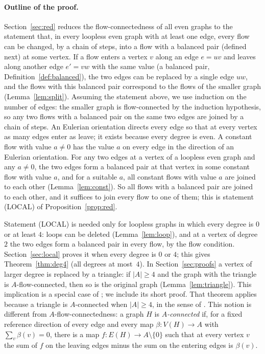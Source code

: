 \documentclass[11pt]{article}
\theoremstyle{definition}
\begin{document}
\paragraph{Outline of the proof.}
Section~\ref{sec:red} reduces the flow-connectedness of all even graphs to the statement that, in every loopless even graph
with at least one edge, every flow can be changed, by a chain of steps, into a flow with a balanced pair (defined next) at some vertex. If a flow enters a vertex $v$ along an edge
$e=uv$ and leaves along another edge $e'=vw$ with the same value (a balanced pair, Definition~\ref{def:balanced}), the two
edges can be replaced by a single edge $uw$, and the flows with this balanced pair correspond to the flows of the smaller
graph (Lemma~\ref{lem:split}). Assuming the statement above, we use induction on the number of edges: the smaller graph is flow-connected by the
induction hypothesis, so any two flows with a balanced pair on the same two edges are joined by a chain of steps. An Eulerian orientation directs every edge so that at every
vertex as many edges enter as leave; it exists because every degree is even. A constant flow with value $a\ne 0$ has
the value $a$ on every edge in the direction of an Eulerian orientation. For any two edges at a vertex of a loopless even graph and any $a\ne 0$,
the two edges form a balanced pair at that vertex in some constant flow with value $a$, and for a suitable $a$, all constant flows with
value $a$ are joined to each other (Lemma~\ref{lem:const}). So all flows with a balanced pair are joined to each other, and it
suffices to join every flow to one of them; this is statement \textup{(LOCAL)} of Proposition~\ref{prop:red}.

Statement \textup{(LOCAL)} is needed only for loopless graphs in which every degree is $0$ or at least $4$: loops can be
deleted (Lemma~\ref{lem:loop}), and at a vertex of degree $2$ the two edges form a balanced pair in every flow, by the flow condition.
Section~\ref{sec:local} proves it when every degree is $0$ or $4$; this gives Theorem~\ref{thm:deg4}
(all degrees at most~$4$). In Section~\ref{sec:proofs} a vertex of larger degree is replaced by a triangle: if
$|A|\ge 4$ and the graph with the triangle is $A$-flow-connected, then so is the original graph
(Lemma~\ref{lem:triangle}). This implication is a special case of \cite[Theorem~5.9(1)]{CLSWX}; we include its short
proof. That theorem applies because a triangle is $A$-connected when $|A|\ge 4$, in the sense of \cite{JLPT}. This
notion is different from $A$-flow-connectedness: a graph $H$ is \emph{$A$-connected} if, for a fixed reference
direction of every edge and every map $\beta\colon V(H)\to A$ with $\sum_v\beta(v)=0$, there is a map
$f\colon E(H)\to A\setminus\{0\}$ such that at every vertex $v$ the sum of $f$ on the leaving edges minus the sum on the
entering edges is $\beta(v)$.
\end{document}
